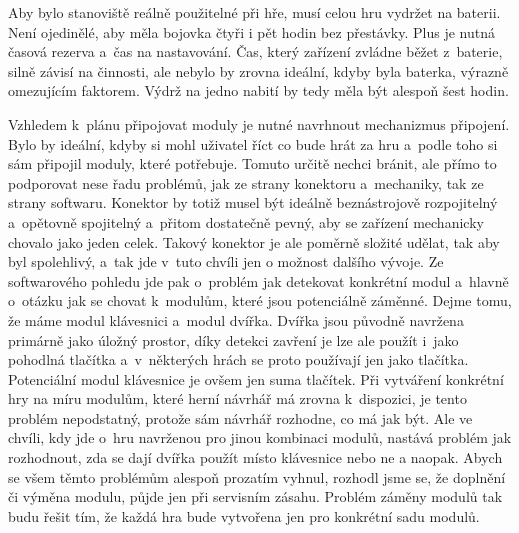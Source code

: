Aby bylo stanoviště reálně použitelné při hře, musí celou hru vydržet na baterii.
Není ojedinělé, aby měla bojovka čtyři i pět hodin bez přestávky.
Plus je nutná časová rezerva a~čas na nastavování.
Čas, který zařízení zvládne běžet z~baterie, silně závisí na činnosti, ale nebylo by zrovna ideální, kdyby byla baterka, výrazně omezujícím faktorem.
Výdrž na jedno nabití by tedy měla být alespoň šest hodin.

Vzhledem k~plánu připojovat moduly je nutné navrhnout mechanizmus připojení.
Bylo by ideální, kdyby si mohl uživatel říct co bude hrát za hru a~podle toho si sám připojil moduly, které potřebuje.
Tomuto určitě nechci bránit, ale přímo to podporovat nese řadu problémů, jak ze strany konektoru a~mechaniky, tak ze strany softwaru.
Konektor by totiž musel být ideálně beznástrojově rozpojitelný a~opětovně spojitelný a~přitom dostatečně pevný, aby se zařízení mechanicky chovalo jako jeden celek.
Takový konektor je ale poměrně složité udělat, tak aby byl spolehlivý, a~tak jde v~tuto chvíli jen o možnost dalšího vývoje.
Ze softwarového pohledu jde pak o~problém jak detekovat konkrétní modul a~hlavně o~otázku jak se chovat k~modulům, které jsou potenciálně záměnné.
Dejme tomu, že máme modul klávesnici a~modul dvířka.
Dvířka jsou původně navržena primárně jako úložný prostor, díky detekci zavření je lze ale použít i~jako pohodlná tlačítka a~v~některých hrách se proto používají jen jako tlačítka.
Potenciální modul klávesnice je ovšem jen suma tlačítek.
Při vytváření konkrétní hry na míru modulům, které herní návrhář má zrovna k~dispozici, je tento problém nepodstatný, protože sám návrhář rozhodne, co má jak být.
Ale ve chvíli, kdy jde o~hru navrženou pro jinou kombinaci modulů, nastává problém jak rozhodnout, zda se dají dvířka použít místo klávesnice nebo ne a naopak.
Abych se všem těmto problémům alespoň prozatím vyhnul, rozhodl jsme se, že doplnění či výměna modulu, půjde jen při servisním zásahu.
Problém záměny modulů tak budu řešit tím, že každá hra bude vytvořena jen pro konkrétní sadu modulů.


